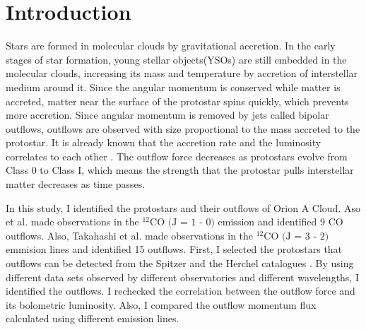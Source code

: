 
\section{Introduction}

Stars are formed in molecular clouds by gravitational accretion. In the early stages of star formation, young stellar objects(YSOs) are still embedded in the molecular clouds, increasing its mass and temperature by accretion of interstellar medium around it. Since the angular momentum is conserved while matter is accreted, matter near the surface of the protostar spins quickly, which prevents more accretion. Since angular momentum is removed by jets called bipolar outflows, outflows are observed with size proportional to the mass accreted to the protostar\cite{bontemps1996evolution}. 
It is already known that the accretion rate and the luminosity correlates to each other \cite{kang2013outflow}. The outflow force decreases as protostars evolve from Class 0 to Class I, which means the strength that the protostar pulls interstellar matter decreases as time passes. 

In this study, I identified the protostars and their outflows of Orion A Cloud. Aso et al. \cite{aso2000dense} made observations in the $^{12}\textrm{CO (J = 1 - 0)}$ emission and identified 9 CO outflows. Also, Takahashi et al. \cite{takahashi2008millimeter} made observations in the $^{12}\textrm{CO (J = 3 - 2)}$ emmision lines and identified 15 outflows. First, I selected the protostars that outflows can be detected from the Spitzer and the Herchel catalogues \cite{megeath2012spitzer, furlan2016herschel}. By using different data sets observed by different observatories and different wavelengths, I identified the outflows. I rechecked the correlation between the outflow force and its bolometric luminosity. Also, I compared the outflow momentum flux calculated using different emission lines. \\

